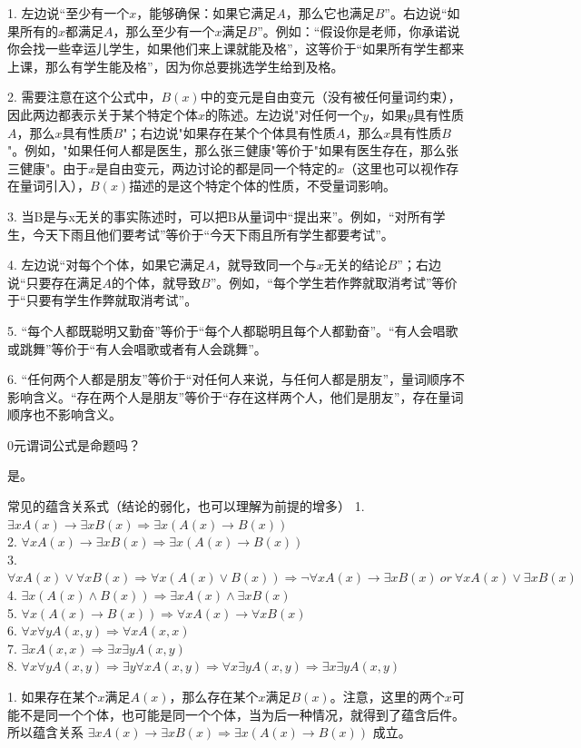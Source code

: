 1. 左边说“至少有一个$x$，能够确保：如果它满足$A$，那么它也满足$B$”。右边说“如果所有的$x$都满足$A$，那么至少有一个$x$满足$B$”。例如：“假设你是老师，你承诺说你会找一些幸运儿学生，如果他们来上课就能及格”，这等价于“如果所有学生都来上课，那么有学生能及格”，因为你总要挑选学生给到及格。

2. 需要注意在这个公式中，$B(x)$中的变元是自由变元（没有被任何量词约束），因此两边都表示关于某个特定个体$x$的陈述。左边说"对任何一个$y$，如果$y$具有性质$A$，那么$x$具有性质$B$"；右边说"如果存在某个个体具有性质$A$，那么$x$具有性质$B$"。例如，"如果任何人都是医生，那么张三健康"等价于"如果有医生存在，那么张三健康"。由于$x$是自由变元，两边讨论的都是同一个特定的$x$（这里也可以视作存在量词引入），$B(x)$描述的是这个特定个体的性质，不受量词影响。

3. 当B是与x无关的事实陈述时，可以把B从量词中“提出来”。例如，“对所有学生，今天下雨且他们要考试”等价于“今天下雨且所有学生都要考试”。

4. 左边说“对每个个体，如果它满足$A$，就导致同一个与$x$无关的结论$B$”；右边说“只要存在满足$A$的个体，就导致$B$”。例如，“每个学生若作弊就取消考试”等价于“只要有学生作弊就取消考试”。

5. “每个人都既聪明又勤奋”等价于“每个人都聪明且每个人都勤奋”。“有人会唱歌或跳舞”等价于“有人会唱歌或者有人会跳舞”。

6. “任何两个人都是朋友”等价于“对任何人来说，与任何人都是朋友”，量词顺序不影响含义。“存在两个人是朋友”等价于“存在这样两个人，他们是朋友”，存在量词顺序也不影响含义。
\begin{example}{}{}
    0元谓词公式是命题吗？
\end{example}
是。
\begin{theorem}{常见的蕴含关系式（结论的弱化，也可以理解为前提的增多）}{}
1. $\exists xA(x)\to\exists xB(x)\Rightarrow\exists x(A(x)\to B(x))$\\
2. $\forall xA(x)\to \exists xB(x)\Rightarrow \exists x(A(x)\to B(x))$\\
3. $\forall xA(x)\lor \forall xB(x)\Rightarrow \forall x(A(x)\lor B(x))\Rightarrow \neg\forall xA(x)\to\exists xB(x)~or~\forall xA(x)\lor \exists xB(x)$\\
4. $\exists x(A(x)\land B(x))\Rightarrow \exists xA(x)\land \exists xB(x)$\\
5. $\forall x(A(x)\to B(x))\Rightarrow \forall xA(x)\to \forall xB(x)$\\
6. $\forall x\forall yA(x,y)\Rightarrow \forall xA(x,x)$\\
7. $\exists xA(x,x)\Rightarrow \exists x\exists yA(x,y)$\\
8. $\forall x\forall yA(x,y)\Rightarrow \exists y\forall xA(x,y)\Rightarrow \forall x\exists yA(x,y)\Rightarrow \exists x\exists yA(x,y)$
\end{theorem}
1. 如果存在某个$x$满足$A(x)$，那么存在某个$x$满足$B(x)$。注意，这里的两个$x$可能不是同一个个体，也可能是同一个个体，当为后一种情况，就得到了蕴含后件。所以蕴含关系 $\exists xA(x)\to\exists xB(x)\Rightarrow\exists x(A(x)\to B(x))$ 成立。

